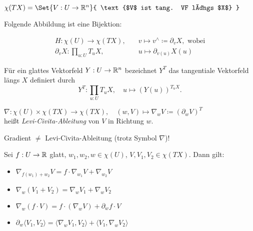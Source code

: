 \documentclass{cheat-sheet}
\begin{document}
\begin{nota}
  $\chi(TX) = \Set{ V : U \to \R^n }{ \text{$V$ ist tang. VF längs $X$} }$
\end{nota}

\begin{bem}
  Folgende Abbildung ist eine Bijektion:

  \begin{align*}
     H : \chi(U) \to \chi(TX), \quad &v \mapsto v^{\wedge} \coloneqq \partial_v X, \text{ wobei}\\
     \partial_v X : \prod_{u : U} T_u X, \quad &u \mapsto \partial_{v(u)} X(u)
   \end{align*} 
\end{bem}

\begin{nota}
  Für ein glattes Vektorfeld $Y : U \to \mathbb{R}^n$ bezeichnet $Y^T$ das tangentiale Vektorfeld längs $X$ definiert durch
  \[ Y^T : \prod_{u : U} T_u X, \quad u \mapsto (Y(u))^{T_u X}. \]
\end{nota}

\begin{defn}
  $\nabla : \chi(U) \times \chi(TX) \to \chi(TX), \quad (w, V) \mapsto \nabla_w V \coloneqq (\partial_w V)^T$\\
  heißt \emph{Levi-Civita-Ableitung} von $V$ in Richtung $w$.
\end{defn}

\begin{acht}
  Gradient $\not=$ Levi-Civita-Ableitung (trotz Symbol $\nabla$)!
\end{acht}

\begin{satz}
  Sei $f : U \to \mathbb{R}$ glatt, $w_1, w_2, w \in \chi(U)$, $V, V_1, V_2 \in \chi(TX)$. Dann gilt:
  \begin{itemize}
    \item $\nabla_{f(w_1) + w_2} V = f \cdot \nabla_{w_1} V + \nabla_{w_2} V$ 
    \item $\nabla_w (V_1 + V_2) = \nabla_w V_1 + \nabla_w V_2$ 
    \item $\nabla_w (f \cdot V) = f \cdot (\nabla_w V) + \partial_w f \cdot V $ 
    \item $\partial_w \langle V_1, V_2 \rangle = \langle \nabla_w V_1 , V_2 \rangle + \langle V_1 , \nabla_w V_2 \rangle$ 
  \end{itemize}
\end{satz}
\end{document}
